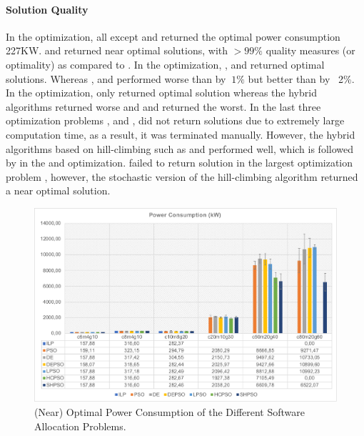 \paragraph{Solution Quality} In the  optimization, all except \depso{} and \pso{} returned the optimal power consumption 227KW. \depso{} and \pso{} returned near optimal solutions, with $>99\%$ quality measures (or optimality) as compared to \ilp. In the  optimization, \ilp, \hcpso{} and \shpso returned optimal solutions. Whereas \de, \lpso{} and \depso{} performed worse than \ilp by $~1\%$ but better than \pso{} by ~2\%.  In the  optimization, only \ilp returned optimal solution whereas the hybrid algorithms returned worse and \pso and \de returned the worst. In the last three optimization problems ,  and , \ilp did not return solutions due to extremely large computation time, as a result, it was terminated manually. However, the hybrid algorithms based on hill-climbing such as \hcpso{} and \shpso{} performed well, which is followed by \depso{} in the  and  optimization. \hcpso{} failed to return solution in the largest optimization problem , however, the stochastic version of the hill-climbing algorithm \shpso{} returned a near optimal solution.
\begin{figure}
\centering
\includegraphics[width=1\linewidth]{img/power_consumption.pdf}
\caption{(Near) Optimal Power Consumption of the Different Software Allocation Problems.}
\label{fig_powerconsumption_ilp_metaheuristic}\vspace{-0.4cm}
\end{figure}

